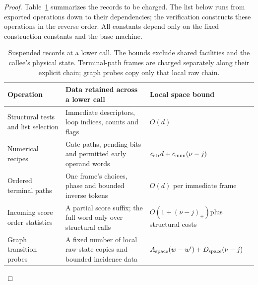 \begin{proof}
Table~\ref{tab:ctrl-records} summarizes the records to be charged.
The list below runs from exported operations down to their dependencies;
the verification constructs these operations in the reverse order.
All constants depend only on the fixed construction constants and the
base machine.

\begin{table}[tbp]
\centering
\small
\renewcommand{\arraystretch}{1.15}
\begin{tabular}{@{}p{}p{}p{}@{}}
\toprule
Operation & Data retained across a lower call & Local space bound \\
\midrule
Structural tests and list selection
 & Immediate descriptors, loop indices, counts and flags
 & $O(d)$ \\
Numerical recipes
 & Gate paths, pending bits and permitted early operand words
 & $c_{\rm str}d+c_{\rm num}(\nu-j)$ \\
Ordered terminal paths
 & One frame's choices, phase and bounded inverse tokens
 & $O(d)$ per immediate frame \\
Incoming score order statistics
 & A partial score suffix; the full word only over structural calls
 & $O(1+(\nu-j)_+)$\newline plus structural costs \\
Graph transition probes
 & A fixed number of local raw-state copies and bounded incidence data
 & $A_{\rm space}(w-w')+D_{\rm space}(\nu-j)$ \\
\bottomrule
\end{tabular}
\caption{Suspended records at a lower call.  The bounds exclude shared
facilities and the callee's physical state.  Terminal-path frames are
charged separately along their explicit chain; graph probes copy only
that local raw chain.}
\label{tab:ctrl-records}
\end{table}


\end{proof}
